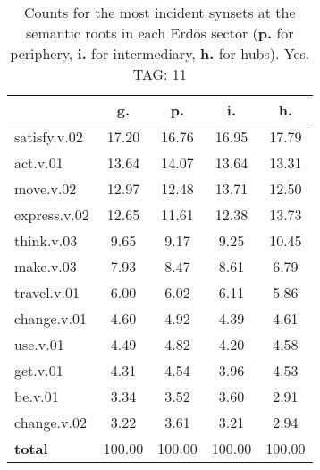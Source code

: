 \begin{table}[h!]
\begin{center}
\begin{tabular}{| l | c | c | c | c |}\hline
 & g. & p. & i. & h. \\\hline
satisfy.v.02 & 17.20  & 16.76  & 16.95  & 17.79 \\\hline
act.v.01 & 13.64  & 14.07  & 13.64  & 13.31 \\\hline
move.v.02 & 12.97  & 12.48  & 13.71  & 12.50 \\\hline
express.v.02 & 12.65  & 11.61  & 12.38  & 13.73 \\\hline
think.v.03 & 9.65  & 9.17  & 9.25  & 10.45 \\\hline
make.v.03 & 7.93  & 8.47  & 8.61  & 6.79 \\\hline
travel.v.01 & 6.00  & 6.02  & 6.11  & 5.86 \\\hline
change.v.01 & 4.60  & 4.92  & 4.39  & 4.61 \\\hline
use.v.01 & 4.49  & 4.82  & 4.20  & 4.58 \\\hline
get.v.01 & 4.31  & 4.54  & 3.96  & 4.53 \\\hline
be.v.01 & 3.34  & 3.52  & 3.60  & 2.91 \\\hline
change.v.02 & 3.22  & 3.61  & 3.21  & 2.94 \\\hline
{{\bf total}} & 100.00  & 100.00  & 100.00  & 100.00 \\\hline
\end{tabular}
\caption{Counts for the most incident synsets at the semantic roots in each Erd\"os sector ({\bf p.} for periphery, {\bf i.} for intermediary, {\bf h.} for hubs). Yes. TAG: 11}
\end{center}
\end{table}